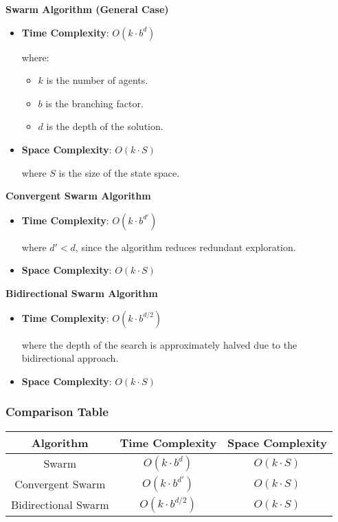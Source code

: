 \textbf{Swarm Algorithm (General Case)}
\begin{itemize}
      \item \textbf{Time Complexity}: \( O(k \cdot b^d) \)

            where:
            \begin{itemize}
                  \item \( k \) is the number of agents.
                  \item \( b \) is the branching factor.
                  \item \( d \) is the depth of the solution.
            \end{itemize}
      \item \textbf{Space Complexity}:  \( O(k \cdot S) \)

            where \( S \) is the size of the state space.
\end{itemize}

\textbf{Convergent Swarm Algorithm}
\begin{itemize}
      \item \textbf{Time Complexity}: \( O(k \cdot b^{d'}) \)

            where \( d' < d \), since the algorithm reduces redundant exploration.
      \item \textbf{Space Complexity}: \( O(k \cdot S) \)
\end{itemize}

\textbf{Bidirectional Swarm Algorithm}
\begin{itemize}
      \item \textbf{Time Complexity}: \( O(k \cdot b^{d/2}) \)

            where the depth of the search is approximately halved due to the bidirectional approach.
      \item \textbf{Space Complexity}: \( O(k \cdot S) \)
\end{itemize}

\subsubsection{Comparison Table}
\begin{table}[h]
      \centering
      \begin{tabular}{|c|c|c|}
            \hline
            \textbf{Algorithm}  & \textbf{Time Complexity} & \textbf{Space Complexity} \\
            \hline
            Swarm               & \( O(k \cdot b^d) \)     & \( O(k \cdot S) \)        \\
            Convergent Swarm    & \( O(k \cdot b^{d'}) \)  & \( O(k \cdot S) \)        \\
            Bidirectional Swarm & \( O(k \cdot b^{d/2}) \) & \( O(k \cdot S) \)        \\
            \hline
      \end{tabular}
      \label{tab:swarm_complexity}
\end{table}
